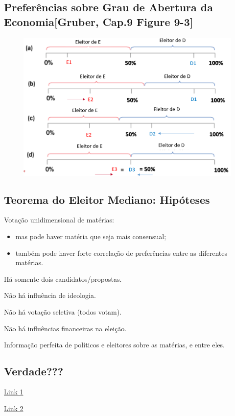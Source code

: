 \documentclass[a4paper,12pt]{article}[abntex2]
\begin{document}
\subsection{\textbf{Preferências sobre Grau de Abertura da Economia}[Gruber, Cap.9 Figure 9-3]}
\begin{figure}[H]
    \centering
    \includegraphics[width=0.7\linewidth]{Imagens/a15i1.png}
\end{figure}

\subsection{\textbf{Teorema do Eleitor Mediano: Hipóteses }}

Votação unidimensional de matérias:\begin{itemize} 
 \item mas pode haver matéria que seja mais consensual;
 \item também pode haver forte correlação de preferências entre as diferentes matérias.
\end{itemize}

Há somente dois candidatos/propostas.

Não há influência de ideologia.

Não há votação seletiva (todos votam). 

Não há influências financeiras na eleição.

Informação perfeita de políticos e eleitores sobre as matérias, e entre eles. 

\subsection{\textbf{Verdade???}}
\href{https://www.infomoney.com.br/politica/lula-tera-de-migrar-para-o-centro-diz-landau/}{Link 1}

\href{https://trademap.com.br/agencia/mercados/tanto-bolsonaro-quanto-lula-terao-que-migrar-para-o-centro-diz-ex-bc-luiz-fernando-figueiredo}{Link 2}
\end{document}
